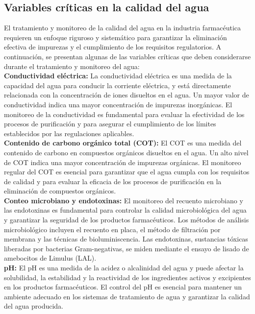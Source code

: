 \subsection{Variables críticas en la calidad del agua}

El tratamiento y monitoreo de la calidad del agua en la industria farmacéutica requieren un enfoque riguroso y sistemático para garantizar la eliminación efectiva de impurezas y el cumplimiento de los requisitos regulatorios. A continuación, se presentan algunas de las variables críticas que deben considerarse durante el tratamiento y monitoreo del agua:\\

\textbf{Conductividad eléctrica:} La conductividad eléctrica es una medida de la capacidad del agua para conducir la corriente eléctrica, y está directamente relacionada con la concentración de iones disueltos en el agua. Un mayor valor de conductividad indica una mayor concentración de impurezas inorgánicas. El monitoreo de la conductividad es fundamental para evaluar la efectividad de los procesos de purificación y para asegurar el cumplimiento de los límites establecidos por las regulaciones aplicables.\\

\textbf{Contenido de carbono orgánico total (COT):} El COT es una medida del contenido de carbono en compuestos
orgánicos disueltos en el agua. Un alto nivel de COT indica una mayor concentración de impurezas orgánicas.
El monitoreo regular del COT es esencial para garantizar que el agua cumpla con los requisitos de calidad y para evaluar la eficacia de los procesos de purificación en la eliminación de compuestos orgánicos.\\

\textbf{Conteo microbiano y endotoxinas:} El monitoreo del recuento microbiano y las endotoxinas es fundamental
para controlar la calidad microbiológica del agua y garantizar la seguridad de los productos farmacéuticos.
Los métodos de análisis microbiológico incluyen el recuento en placa, el método de filtración por membrana
y las técnicas de bioluminiscencia. Las endotoxinas, sustancias tóxicas liberadas por bacterias Gram-negativas,
se miden mediante el ensayo de lisado de amebocitos de Limulus (LAL).\\

\textbf{pH:} El pH es una medida de la acidez o alcalinidad del agua y puede afectar la solubilidad,
la estabilidad y la reactividad de los ingredientes activos y excipientes en los productos farmacéuticos.
El control del pH es esencial para mantener un ambiente adecuado en los sistemas de tratamiento de agua y
garantizar la calidad del agua producida.\\


